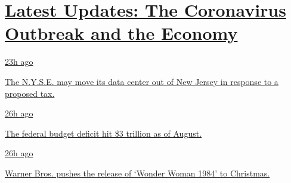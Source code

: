 \hypertarget{latest-updates-the-coronavirus-outbreak-and-the-economy}{%
\section{\texorpdfstring{\href{https://www.nytimes3xbfgragh.onion/live/2020/09/11/business/stock-market-today-coronavirus?action=click\&pgtype=Article\&state=default\&region=MAIN_CONTENT_1\&context=storylines_live_updates}{Latest
Updates: The Coronavirus Outbreak and the
Economy}}{Latest Updates: The Coronavirus Outbreak and the Economy}}\label{latest-updates-the-coronavirus-outbreak-and-the-economy}}

\href{https://www.nytimes3xbfgragh.onion/live/2020/09/11/business/stock-market-today-coronavirus?action=click\&pgtype=Article\&state=default\&region=MAIN_CONTENT_1\&context=storylines_live_updates\#the-nyse-may-move-its-data-center-out-of-new-jersey-in-response-to-a-proposed-tax}{23h
ago}

\href{https://www.nytimes3xbfgragh.onion/live/2020/09/11/business/stock-market-today-coronavirus?action=click\&pgtype=Article\&state=default\&region=MAIN_CONTENT_1\&context=storylines_live_updates\#the-nyse-may-move-its-data-center-out-of-new-jersey-in-response-to-a-proposed-tax}{The
N.Y.S.E. may move its data center out of New Jersey in response to a
proposed tax.}

\href{https://www.nytimes3xbfgragh.onion/live/2020/09/11/business/stock-market-today-coronavirus?action=click\&pgtype=Article\&state=default\&region=MAIN_CONTENT_1\&context=storylines_live_updates\#the-federal-budget-deficit-hit-3-trillion-as-of-august}{26h
ago}

\href{https://www.nytimes3xbfgragh.onion/live/2020/09/11/business/stock-market-today-coronavirus?action=click\&pgtype=Article\&state=default\&region=MAIN_CONTENT_1\&context=storylines_live_updates\#the-federal-budget-deficit-hit-3-trillion-as-of-august}{The
federal budget deficit hit \$3 trillion as of August.}

\href{https://www.nytimes3xbfgragh.onion/live/2020/09/11/business/stock-market-today-coronavirus?action=click\&pgtype=Article\&state=default\&region=MAIN_CONTENT_1\&context=storylines_live_updates\#warner-bros-pushes-the-release-of-wonder-woman-1984-to-christmas}{26h
ago}

\href{https://www.nytimes3xbfgragh.onion/live/2020/09/11/business/stock-market-today-coronavirus?action=click\&pgtype=Article\&state=default\&region=MAIN_CONTENT_1\&context=storylines_live_updates\#warner-bros-pushes-the-release-of-wonder-woman-1984-to-christmas}{Warner
Bros. pushes the release of `Wonder Woman 1984' to Christmas.}


